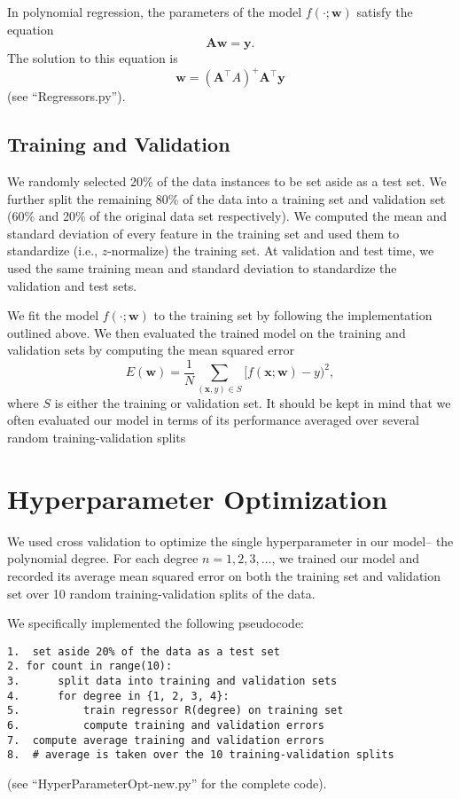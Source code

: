 \documentclass[12pt]{article}
\begin{document}
In polynomial regression, the parameters of the model $f(\cdot; \mathbf{w})$ satisfy the equation
\[ \mathbf{A}\mathbf{w} = \mathbf{y}. \]
The solution to this equation is
\[ \mathbf{w} = (\mathbf{A}^\top A)^+ \mathbf{A}^\top\mathbf{y} \]
(see ``Regressors.py'').

\subsection{Training and Validation}

We randomly selected 20\% of the data instances to be set aside as a test set. We further split the remaining 80\% of the data into a training set and validation set (60\% and 20\% of the original data set respectively). We computed the mean and standard deviation of every feature in the training set and used them to standardize (i.e., $z$-normalize) the training set. At validation and test time, we used the same training mean and standard deviation to standardize the validation and test sets.

We fit the model $f(\cdot;\mathbf{w})$ to the training set by following the implementation outlined above. We then evaluated the trained model on the training and validation sets by computing the mean squared error
\[ E(\mathbf{w}) = \frac{1}{N}\sum_{(\mathbf{x},y)\in S} [f(\mathbf{x};\mathbf{w})-y)^2, \]
where $S$ is either the training or validation set. It should be kept in mind that we often evaluated our model in terms of its performance averaged over several random training-validation splits

\section{Hyperparameter Optimization}

We used cross validation to optimize the single hyperparameter in our model-- the polynomial degree. For each degree $n=1,2,3,\ldots$, we trained our model and recorded its average mean squared error on both the training set and validation set over 10 random training-validation splits of the data.

We specifically implemented the following pseudocode:
\begin{verbatim}
1.	set aside 20% of the data as a test set
2. for count in range(10):
3.		split data into training and validation sets
4.		for degree in {1, 2, 3, 4}:
5.			train regressor R(degree) on training set
6.			compute training and validation errors
7.	compute average training and validation errors
8.	# average is taken over the 10 training-validation splits
\end{verbatim}
(see ``HyperParameterOpt-new.py'' for the complete code).
\end{document}

